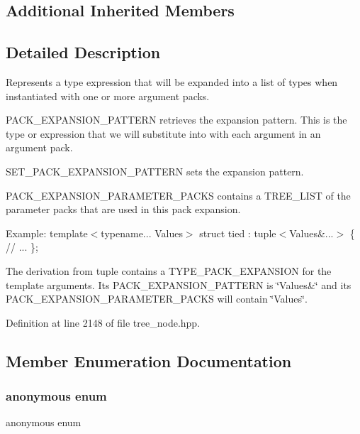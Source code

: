 \subsection*{Additional Inherited Members}


\subsection{Detailed Description}
Represents a type expression that will be expanded into a list of types when instantiated with one or more argument packs. 

P\+A\+C\+K\+\_\+\+E\+X\+P\+A\+N\+S\+I\+O\+N\+\_\+\+P\+A\+T\+T\+E\+RN retrieves the expansion pattern. This is the type or expression that we will substitute into with each argument in an argument pack.

S\+E\+T\+\_\+\+P\+A\+C\+K\+\_\+\+E\+X\+P\+A\+N\+S\+I\+O\+N\+\_\+\+P\+A\+T\+T\+E\+RN sets the expansion pattern.

P\+A\+C\+K\+\_\+\+E\+X\+P\+A\+N\+S\+I\+O\+N\+\_\+\+P\+A\+R\+A\+M\+E\+T\+E\+R\+\_\+\+P\+A\+C\+KS contains a T\+R\+E\+E\+\_\+\+L\+I\+ST of the parameter packs that are used in this pack expansion.

Example\+: template$<$typename... Values$>$ struct tied \+: tuple$<$\+Values\&...$>$ \{ // ... \};

The derivation from tuple contains a T\+Y\+P\+E\+\_\+\+P\+A\+C\+K\+\_\+\+E\+X\+P\+A\+N\+S\+I\+ON for the template arguments. Its P\+A\+C\+K\+\_\+\+E\+X\+P\+A\+N\+S\+I\+O\+N\+\_\+\+P\+A\+T\+T\+E\+RN is \char`\"{}\+Values\&\char`\"{} and its P\+A\+C\+K\+\_\+\+E\+X\+P\+A\+N\+S\+I\+O\+N\+\_\+\+P\+A\+R\+A\+M\+E\+T\+E\+R\+\_\+\+P\+A\+C\+KS will contain \char`\"{}\+Values\char`\"{}. 

Definition at line 2148 of file tree\+\_\+node.\+hpp.



\subsection{Member Enumeration Documentation}
\mbox{\label{structtype__pack__expansion_a5129e4215f774ea4fcd3afd69338b519}} 
\subsubsection{\texorpdfstring{anonymous enum}{anonymous enum}}
{\footnotesize\ttfamily anonymous enum}



